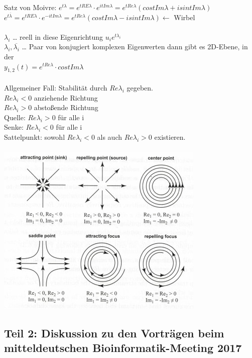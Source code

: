 Satz von Moivre: $e^{t \lambda} = e^{t RE \lambda} \cdot e^{i t Im \lambda} = e^{t Re \lambda} (cos t Im \lambda + i sin t Im \lambda)$\\
$e^{t \overline{\lambda}} = e^{t RE \lambda} \cdot e^{- i t Im \lambda} = e^{t Re \lambda} (cos t Im \lambda - i sin t Im \lambda) \leftarrow$ Wirbel\\\\

$\lambda_i$ … reell in diese Eigenrichtung $u_i e^{t \lambda_i}$\\
$\lambda_i, \overline{\lambda_i}$ … Paar von konjugiert komplexen Eigenwerten dann gibt es 2D-Ebene, in der \\
$y_{1,2}(t)=e^{t Re \lambda} \cdot cos t Im \lambda$\\\\


Allgemeiner Fall: Stabilität durch $Re \lambda_i$ gegeben.\\
$Re \lambda_i < 0$ anziehende Richtung\\
$Re \lambda_i > 0$ abstoßende Richtung\\
Quelle: $Re \lambda_i > 0$ für alle i\\
Senke: $Re \lambda_i < 0$ für alle i\\
Sattelpunkt: sowohl $Re \lambda_i < 0$ als auch $Re \lambda_i > 0$ existieren.
\\\\
\includegraphics[scale=1.750]{lectures/170511/pix/critical_points}

\subsection{Teil 2: Diskussion zu den Vorträgen beim mitteldeutschen Bioinformatik-Meeting 2017}